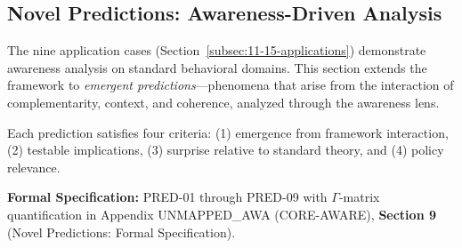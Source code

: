 \subsection{Novel Predictions: Awareness-Driven Analysis}
\label{subsec:11-16-novel-predictions}

The nine application cases (Section~\ref{subsec:11-15-applications}) demonstrate
awareness analysis on standard behavioral domains. This section extends the
framework to \emph{emergent predictions}---phenomena that arise from the
interaction of complementarity, context, and coherence, analyzed through
the awareness lens.

Each prediction satisfies four criteria: (1) emergence from framework
interaction, (2) testable implications, (3) surprise relative to standard
theory, and (4) policy relevance.



















\begin{cross-reference}
\textbf{Formal Specification:} PRED-01 through PRED-09 with $\Gamma$-matrix
quantification in Appendix UNMAPPED_AWA (CORE-AWARE), \textbf{Section 9}
(Novel Predictions: Formal Specification).
\end{cross-reference}

